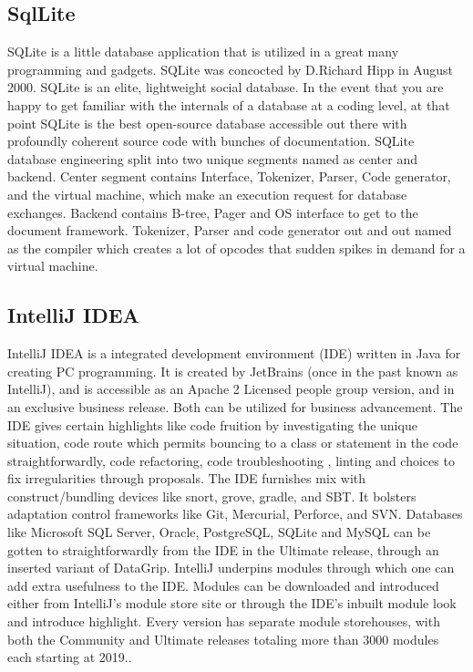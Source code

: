 \documentclass[oneside,12pt]{Classes/VTU}
\begin{document}
	\subsection{SqlLite}
	 SQLite is a little database application that is utilized in a great many programming and gadgets. SQLite was concocted by D.Richard Hipp in August 2000. SQLite is an elite, lightweight social database. In the event that you are happy to get familiar with the internals of a database at a coding level, at that point SQLite is the best open-source database accessible out there with profoundly coherent source code with bunches of documentation. SQLite database engineering split into two unique segments named as center and backend. Center segment contains Interface, Tokenizer, Parser, Code generator, and the virtual machine, which make an execution request for database exchanges. Backend contains B-tree, Pager and OS interface to get to the document framework. Tokenizer, Parser and code generator out and out named as the compiler which creates a lot of opcodes that sudden spikes in demand for a virtual machine.
	
	\subsection{IntelliJ IDEA}
	IntelliJ IDEA is a integrated development environment (IDE) written in Java for creating PC programming. It is created by JetBrains (once in the past known as IntelliJ), and is accessible as an Apache 2 Licensed people group version, and in an exclusive business release. Both can be utilized for business advancement. The IDE gives certain highlights like code fruition by investigating the unique situation, code route which permits bouncing to a class or statement in the code straightforwardly, code refactoring, code troubleshooting , linting and choices to fix irregularities through proposals. The IDE furnishes mix with construct/bundling devices like snort, grove, gradle, and SBT. It bolsters adaptation control frameworks like Git, Mercurial, Perforce, and SVN. Databases like Microsoft SQL Server, Oracle, PostgreSQL, SQLite and MySQL can be gotten to straightforwardly from the IDE in the Ultimate release, through an inserted variant of DataGrip. IntelliJ underpins modules through which one can add extra usefulness to the IDE. Modules can be downloaded and introduced either from IntelliJ's module store site or through the IDE's inbuilt module look and introduce highlight. Every version has separate module storehouses, with both the Community and Ultimate releases totaling more than 3000 modules each starting at 2019..
	
\end{document}
